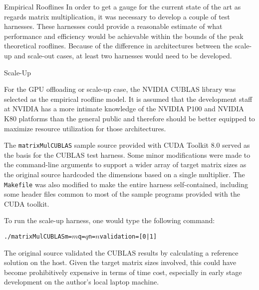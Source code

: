 \documentclass{article}
\begin{document}
\begin{section}{Empirical Rooflines}
  In order to get a gauge for the current state of the art as regards matrix multiplication, it was necessary to develop a couple of test harnesses.
  These harnesses could provide a reasonable estimate of what performance and efficiency would be achievable within the bounds of the peak theoretical
  rooflines. Because of the difference in architectures between the scale-up and scale-out cases, at least two harnesses would need to be developed.
  \begin{subsection}{Scale-Up}
    \begin{paragraph}{}
      For the GPU offloading or scale-up case, the NVIDIA CUBLAS library was selected as the empirical roofline model. It is assumed that the development
      staff at NVIDIA has a more intimate knowledge of the NVIDIA P100 and NVIDIA K80 platforms than the general public and therefore should be better
      equipped to maximize resource utilization for those architectures.
    \end{paragraph}
    \begin{paragraph}{}
      The \texttt{matrixMulCUBLAS} sample source provided with CUDA Toolkit 8.0 served as the basis for the CUBLAS test harness. Some minor modifications
      were made to the command-line arguments to support a wider array of target matrix sizes as the original source hardcoded the dimensions based on a single
      multiplier. The \texttt{Makefile} was also modified to make the entire harness self-contained, including some header files common to most of the sample
      programs provided with the CUDA toolkit.
    \end{paragraph}
    \begin{paragraph}{}
      To run the scale-up harness, one would type the following command:
      \begin{subparagraph}{}
        \begin{alltt}
          ./matrixMulCUBLAS m=\(m\) q=\(q\) n=\(n\) validation=[0|1]
        \end{alltt}
      \end{subparagraph}
    \end{paragraph}
    \begin{paragraph}{}
      The original source validated the CUBLAS results by calculating a reference solution on the host. Given the target matrix sizes involved, this could
      have become prohibitively expensive in terms of time cost, especially in early stage development on the author's local laptop machine.

\end{paragraph}
\end{subsection}
\end{section}
\end{document}
